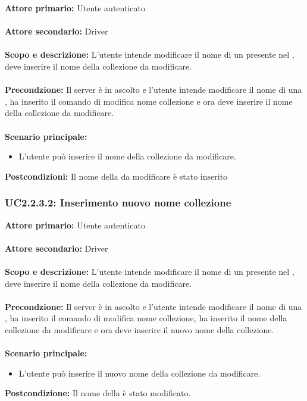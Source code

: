 \documentclass{scalatekids-article}
\begin{document}
\textbf{Attore primario:} Utente autenticato\\ \\
\textbf{Attore secondario:} Driver\\ \\
\textbf{Scopo e descrizione:} L'utente intende modificare il nome di un  presente nel , deve inserire il nome della collezione da modificare.\\ \\
\textbf{Precondzione:} Il server è in ascolto e l'utente intende modificare il nome di una , ha inserito il comando di modifica nome collezione e ora deve inserire il nome della collezione da modificare.\\ \\
\textbf{Scenario principale:}
\begin{itemize}
\item L'utente può inserire il nome della collezione da modificare.
\end{itemize}
\textbf{Postcondizioni:} Il nome della  da modificare è stato inserito

\subsubsection{UC2.2.3.2: Inserimento nuovo nome collezione}

\textbf{Attore primario:} Utente autenticato\\ \\
\textbf{Attore secondario:} Driver\\ \\
\textbf{Scopo e descrizione:} L'utente intende modificare il nome di un  presente nel , deve inserire il nome della collezione da modificare.\\ \\
\textbf{Precondzione:} Il server è in ascolto e l'utente intende modificare il nome di una , ha inserito il comando di modifica nome collezione, ha inserito il nome della collezione da modificare e ora deve inserire il nuovo nome della collezione.\\ \\
\textbf{Scenario principale:}
\begin{itemize}
\item L'utente può inserire il nuovo nome della collezione da modificare.
\end{itemize}
\textbf{Postcondizione:} Il nome della  è stato modificato.
\end{document}
